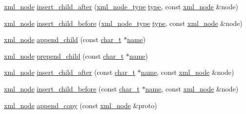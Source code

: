 \begin{DoxyCompactItemize}
\item 
\hyperlink{classpugi_1_1xml__node}{xml\-\_\-node} \hyperlink{classpugi_1_1xml__node_a4dd8d25c02560a2692c43cc4779fb7e3}{insert\-\_\-child\-\_\-after} (\hyperlink{namespacepugi_a137e94a038e4ab0ada6477cf7f6153a9}{xml\-\_\-node\-\_\-type} \hyperlink{classpugi_1_1xml__node_ab881e8c41edc84bf7507591d1ad8ead4}{type}, const \hyperlink{classpugi_1_1xml__node}{xml\-\_\-node} \&node)
\item 
\hyperlink{classpugi_1_1xml__node}{xml\-\_\-node} \hyperlink{classpugi_1_1xml__node_afe89f53c01eac8209b06f9fe7f84e7c1}{insert\-\_\-child\-\_\-before} (\hyperlink{namespacepugi_a137e94a038e4ab0ada6477cf7f6153a9}{xml\-\_\-node\-\_\-type} \hyperlink{classpugi_1_1xml__node_ab881e8c41edc84bf7507591d1ad8ead4}{type}, const \hyperlink{classpugi_1_1xml__node}{xml\-\_\-node} \&node)
\item 
\hyperlink{classpugi_1_1xml__node}{xml\-\_\-node} \hyperlink{classpugi_1_1xml__node_a448342425806a4ad8068bf98fd4ff462}{append\-\_\-child} (const \hyperlink{namespacepugi_aef5a7a62cba0507542220ea15afe39df}{char\-\_\-t} $\ast$\hyperlink{classpugi_1_1xml__node_ac765caace42ecf252d90aea81e09df57}{name})
\item 
\hyperlink{classpugi_1_1xml__node}{xml\-\_\-node} \hyperlink{classpugi_1_1xml__node_afa78286431f99a0f35b18185e11e28e8}{prepend\-\_\-child} (const \hyperlink{namespacepugi_aef5a7a62cba0507542220ea15afe39df}{char\-\_\-t} $\ast$\hyperlink{classpugi_1_1xml__node_ac765caace42ecf252d90aea81e09df57}{name})
\item 
\hyperlink{classpugi_1_1xml__node}{xml\-\_\-node} \hyperlink{classpugi_1_1xml__node_a778c2246fef9964b2d947253a86f2982}{insert\-\_\-child\-\_\-after} (const \hyperlink{namespacepugi_aef5a7a62cba0507542220ea15afe39df}{char\-\_\-t} $\ast$\hyperlink{classpugi_1_1xml__node_ac765caace42ecf252d90aea81e09df57}{name}, const \hyperlink{classpugi_1_1xml__node}{xml\-\_\-node} \&node)
\item 
\hyperlink{classpugi_1_1xml__node}{xml\-\_\-node} \hyperlink{classpugi_1_1xml__node_a70fa68762aed11c82a1b913571df4394}{insert\-\_\-child\-\_\-before} (const \hyperlink{namespacepugi_aef5a7a62cba0507542220ea15afe39df}{char\-\_\-t} $\ast$\hyperlink{classpugi_1_1xml__node_ac765caace42ecf252d90aea81e09df57}{name}, const \hyperlink{classpugi_1_1xml__node}{xml\-\_\-node} \&node)
\item 
\hyperlink{classpugi_1_1xml__node}{xml\-\_\-node} \hyperlink{classpugi_1_1xml__node_a17971e2b69c4dd4f45c461ebffe96732}{append\-\_\-copy} (const \hyperlink{classpugi_1_1xml__node}{xml\-\_\-node} \&proto)

\end{DoxyCompactItemize}
